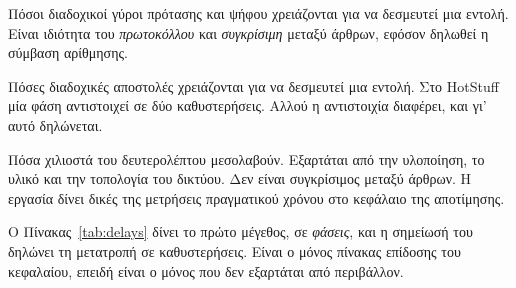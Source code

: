 \begin{description}[leftmargin=2.2em,style=nextline,font=\normalfont\bfseries]
  \item[Φάσεις.] Πόσοι διαδοχικοί γύροι πρότασης και ψήφου χρειάζονται
  για να δεσμευτεί μια εντολή. Είναι ιδιότητα του \emph{πρωτοκόλλου} και
  \emph{συγκρίσιμη} μεταξύ άρθρων, εφόσον δηλωθεί η σύμβαση αρίθμησης.
  \item[Καθυστερήσεις μηνυμάτων.] Πόσες διαδοχικές αποστολές
  χρειάζονται για να δεσμευτεί μια εντολή. Στο HotStuff μία φάση
  αντιστοιχεί σε δύο καθυστερήσεις. Αλλού η αντιστοιχία διαφέρει, και
  γι' αυτό δηλώνεται.
  \item[Πραγματικός χρόνος.] Πόσα χιλιοστά του δευτερολέπτου
  μεσολαβούν. Εξαρτάται από την υλοποίηση, το υλικό και την τοπολογία
  του δικτύου. Δεν είναι συγκρίσιμος μεταξύ άρθρων. Η εργασία δίνει
  δικές της μετρήσεις πραγματικού χρόνου στο κεφάλαιο της αποτίμησης.
\end{description}

Ο Πίνακας~\ref{tab:delays} δίνει το πρώτο μέγεθος, σε \emph{φάσεις}, και
η σημείωσή του δηλώνει τη μετατροπή σε καθυστερήσεις. Είναι ο μόνος
πίνακας επίδοσης του κεφαλαίου, επειδή είναι ο μόνος που δεν εξαρτάται
από περιβάλλον.


